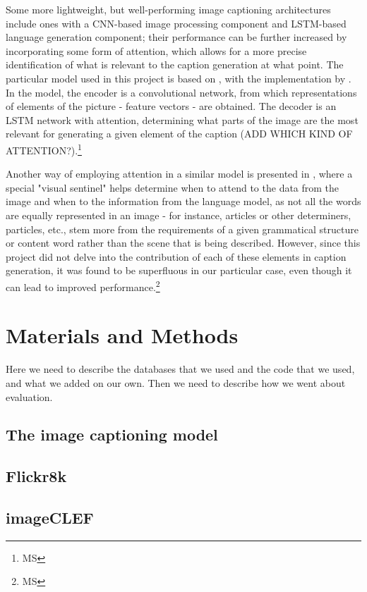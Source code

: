\documentclass[11pt]{article}
\begin{document}
Some more lightweight, but well-performing image captioning architectures include ones with a CNN-based image processing component and LSTM-based language generation component; their performance can be further increased by incorporating some form of attention, which allows for a more precise identification of what is relevant to the caption generation at what point. The particular model used in this project is based on \cite{xu2015attend}, with the implementation by \cite{ilinykh}. In the model, the encoder is a convolutional network, from which representations of elements of the picture - feature vectors - are obtained. The decoder is an LSTM network with attention, determining what parts of the image are the most relevant for generating a given element of the caption (ADD WHICH KIND OF ATTENTION?).\footnote{MS} 

Another way of employing attention in a similar model is presented in \cite{lu16}, where a special "visual sentinel" helps determine when to attend to the data from the image and when to the information from the language model, as not all the words are equally represented in an image - for instance, articles or other determiners, particles, etc., stem more from the requirements of a given grammatical structure or content word rather than the scene that is being described. However, since this project did not delve into the contribution of each of these elements in caption generation, it was found to be superfluous in our particular case, even though it can lead to improved performance.\footnote{MS}



\section{Materials and Methods}

Here we need to describe the databases that we used and the code that we used, and what we added on our own. Then we need to describe how we went about evaluation.

\subsection{The image captioning model}
\subsection{Flickr8k}
\subsection{imageCLEF}
\end{document}
